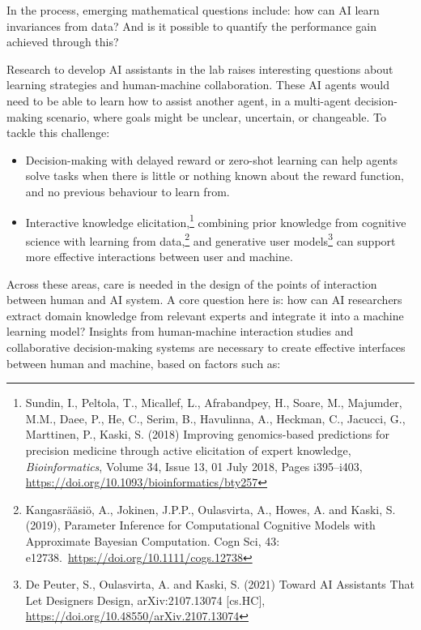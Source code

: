 In the process, emerging mathematical questions include: how can AI
learn invariances from data? And is it possible to quantify the
performance gain achieved through this?

Research to develop AI assistants in the lab raises interesting
questions about learning strategies and human-machine collaboration.
These AI agents would need to be able to learn how to assist another
agent, in a multi-agent decision-making scenario, where goals might be
unclear, uncertain, or changeable. To tackle this challenge:

\begin{itemize}
\item
  Decision-making with delayed reward or zero-shot learning can help
  agents solve tasks when there is little or nothing known about the
  reward function, and no previous behaviour to learn from.
\item
  Interactive knowledge elicitation,\footnote{Sundin, I., Peltola, T.,
    Micallef, L., Afrabandpey, H., Soare, M., Majumder, M.M., Daee, P.,
    He, C., Serim, B., Havulinna, A., Heckman, C., Jacucci, G.,
    Marttinen, P., Kaski, S. (2018) Improving genomics-based predictions
    for precision medicine through active elicitation of expert
    knowledge, \emph{Bioinformatics}, Volume 34, Issue 13, 01 July 2018,
    Pages i395--i403,
    \url{https://doi.org/10.1093/bioinformatics/bty257}}
  combining prior knowledge from cognitive science with learning from
  data,\footnote{Kangasrääsiö, A., Jokinen, J.P.P., Oulasvirta, A.,
    Howes, A. and Kaski, S. (2019), Parameter Inference for
    Computational Cognitive Models with Approximate Bayesian
    Computation. Cogn Sci, 43:
    e12738.~\url{https://doi.org/10.1111/cogs.12738}}
  and generative user models\footnote{De Peuter, S., Oulasvirta, A. and
    Kaski, S. (2021) Toward AI Assistants That Let Designers Design,
    arXiv:2107.13074 {[}cs.HC{]},
    \url{https://doi.org/10.48550/arXiv.2107.13074}}
  can support more effective interactions between user and machine.
\end{itemize}

Across these areas, care is needed in the design of the points of
interaction between human and AI system. A core question here is: how
can AI researchers extract domain knowledge from relevant experts and
integrate it into a machine learning model? Insights from human-machine
interaction studies and collaborative decision-making systems are
necessary to create effective interfaces between human and machine,
based on factors such as:

